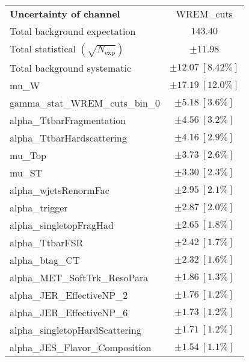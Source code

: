 
\begin{table}
\begin{center}
\setlength{\tabcolsep}{0.0pc}
\begin{tabular*}{\textwidth}{@{\extracolsep{\fill}}lc}
\noalign{\smallskip}\hline\noalign{\smallskip}
{\textbf{Uncertainty of channel}}                                    & WREM\_cuts            \\
\noalign{\smallskip}\hline\noalign{\smallskip}
Total background expectation             &  $143.40$       \\
\noalign{\smallskip}\hline\noalign{\smallskip}
Total statistical $(\sqrt{N_{\mathrm{exp}}})$              & $\pm 11.98$       \\
Total background systematic               & $\pm 12.07\ [8.42\%] $             \\
\noalign{\smallskip}\hline\noalign{\smallskip}
\noalign{\smallskip}\hline\noalign{\smallskip}
mu\_W         & $\pm 17.19\ [12.0\%] $       \\
gamma\_stat\_WREM\_cuts\_bin\_0         & $\pm 5.18\ [3.6\%] $       \\
alpha\_TtbarFragmentation         & $\pm 4.56\ [3.2\%] $       \\
alpha\_TtbarHardscattering         & $\pm 4.16\ [2.9\%] $       \\
mu\_Top         & $\pm 3.73\ [2.6\%] $       \\
mu\_ST         & $\pm 3.30\ [2.3\%] $       \\
alpha\_wjetsRenormFac         & $\pm 2.95\ [2.1\%] $       \\
alpha\_trigger         & $\pm 2.87\ [2.0\%] $       \\
alpha\_singletopFragHad         & $\pm 2.65\ [1.8\%] $       \\
alpha\_TtbarFSR         & $\pm 2.42\ [1.7\%] $       \\
alpha\_btag\_CT         & $\pm 2.32\ [1.6\%] $       \\
alpha\_MET\_SoftTrk\_ResoPara         & $\pm 1.86\ [1.3\%] $       \\
alpha\_JER\_EffectiveNP\_2         & $\pm 1.76\ [1.2\%] $       \\
alpha\_JER\_EffectiveNP\_6         & $\pm 1.73\ [1.2\%] $       \\
alpha\_singletopHardScattering         & $\pm 1.71\ [1.2\%] $       \\
alpha\_JES\_Flavor\_Composition         & $\pm 1.54\ [1.1\%] $       \\

\end{tabular*}
\end{center}
\end{table}
